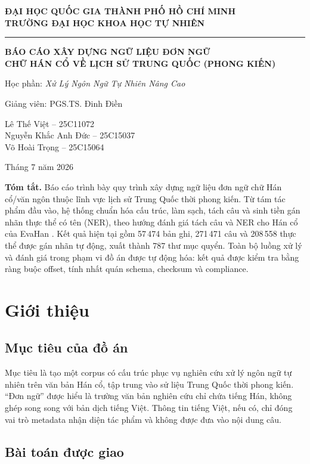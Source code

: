 \documentclass[11pt,a4paper]{article}
\newcommand{\reportauthor}{%
  Lê Thế Việt -- 25C11072\\
  Nguyễn Khắc Anh Đức -- 25C15037\\
  Võ Hoài Trọng -- 25C15064%
}
\newcommand{\coursename}{Học phần: \textit{Xử Lý Ngôn Ngữ Tự Nhiên Nâng Cao}}
\newcommand{\lecturer}{Giảng viên: PGS.TS. Đinh Điền}
\begin{document}
\begin{center}
  {\large\bfseries ĐẠI HỌC QUỐC GIA THÀNH PHỐ HỒ CHÍ MINH\\
  TRƯỜNG ĐẠI HỌC KHOA HỌC TỰ NHIÊN}\par
  \vspace{0.8em}
  \rule{0.72\textwidth}{0.5pt}\par
  \vspace{1.2em}
  {\Large\bfseries BÁO CÁO XÂY DỰNG NGỮ LIỆU ĐƠN NGỮ\\
  CHỮ HÁN CỔ VỀ LỊCH SỬ TRUNG QUỐC (PHONG KIẾN)}\par
  \vspace{0.6em}
  {\coursename}\par
  {\lecturer}\par
  {\reportauthor}\par
  \vspace{0.35em}
  {\small Tháng 7 năm 2026}
\end{center}

\noindent\textbf{Tóm tắt.}
Báo cáo trình bày quy trình xây dựng ngữ liệu đơn ngữ chữ Hán cổ/văn ngôn thuộc
lĩnh vực lịch sử Trung Quốc thời phong kiến. Từ tám tác phẩm đầu vào, hệ thống
chuẩn hóa cấu trúc, làm sạch, tách câu và sinh tiền gán nhãn thực thể có tên
(NER), theo hướng đánh giá tách câu và NER cho Hán cổ của EvaHan
\cite{evahan2025}. Kết quả hiện tại gồm 57\,474 bản ghi, 271\,471 câu và 208\,558 thực thể
được gán nhãn tự động, xuất thành 787 thư mục quyển. Toàn bộ luồng xử lý và
đánh giá trong phạm vi đồ án được tự động hóa: kết quả được kiểm tra bằng ràng
buộc offset, tính nhất quán schema, checksum và compliance.

\section{Giới thiệu}

\subsection{Mục tiêu của đồ án}

Mục tiêu là tạo một corpus có cấu trúc phục vụ nghiên cứu xử lý ngôn ngữ tự
nhiên trên văn bản Hán cổ, tập trung vào sử liệu Trung Quốc thời phong kiến.
``Đơn ngữ'' được hiểu là trường văn bản nghiên cứu chỉ chứa tiếng Hán, không
ghép song song với bản dịch tiếng Việt. Thông tin tiếng Việt, nếu có, chỉ đóng
vai trò metadata nhận diện tác phẩm và không được đưa vào nội dung câu.

\subsection{Bài toán được giao}
\end{document}
